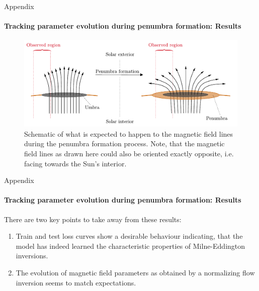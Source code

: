 \documentclass{beamer}
\begin{document}
\begin{frame}[allowframebreaks]{Appendix}
	\framesubtitle{Tracking parameter evolution during penumbra formation: Results} %
	\begin{figure}[h!] %
		\centering
		\includegraphics[width=\textwidth]{figures/thesis/penumbraformation.pdf}
		\caption{Schematic of what is expected to happen to the magnetic field lines during the penumbra formation process. Note, that the magnetic field lines as drawn here could also be oriented exactly opposite, i.e. facing towards the Sun's interior.}
		\label{fig:penumbraformation}
	\end{figure}
\end{frame}

\begin{frame}[allowframebreaks]{Appendix}
	\framesubtitle{Tracking parameter evolution during penumbra formation: Results} %
	There are two key points to take away from these results:
	\begin{enumerate}
		\item Train and test loss curves show a desirable behaviour indicating, that the model has indeed learned the characteristic properties of Milne-Eddington inversions.
		\item The evolution of magnetic field parameters as obtained by a normalizing flow inversion seems to match expectations.
	\end{enumerate}
\end{frame}
\end{document}
